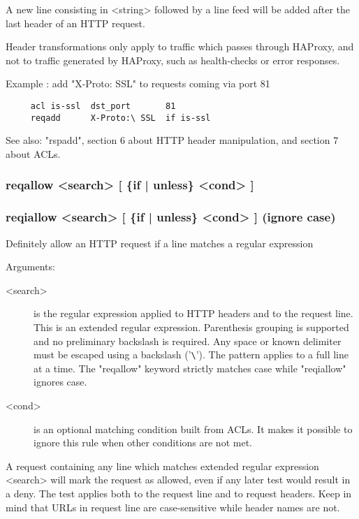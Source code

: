   A new line consisting in <string> followed by a line feed will be added after
  the last header of an HTTP request.

  Header transformations only apply to traffic which passes through HAProxy,
  and not to traffic generated by HAProxy, such as health-checks or error
  responses.

  Example : add "X-Proto: SSL" to requests coming via port 81
\begin{verbatim}
     acl is-ssl  dst_port       81
     reqadd      X-Proto:\ SSL  if is-ssl
\end{verbatim}

  See also: "rspadd", section 6 about HTTP header manipulation, and section 7
            about ACLs.

\subsubsection[reqallow]{reqallow  <search> [ \{if | unless\} <cond> ]}
\subsubsection[reqiallow]{reqiallow <search> [ \{if | unless\} <cond> ] (ignore case)}


  Definitely allow an HTTP request if a line matches a regular expression


  Arguments:

\begin{description}
\item[<search>] is the regular expression applied to HTTP headers and to the
              request line. This is an extended regular expression. Parenthesis
              grouping is supported and no preliminary backslash is required.
              Any space or known delimiter must be escaped using a backslash
              ('\verb|\|'). The pattern applies to a full line at a time. The
              "reqallow" keyword strictly matches case while "reqiallow"
              ignores case.

\item[<cond>] is an optional matching condition built from ACLs. It makes it
              possible to ignore this rule when other conditions are not met.
\end{description}

  A request containing any line which matches extended regular expression
  <search> will mark the request as allowed, even if any later test would
  result in a deny. The test applies both to the request line and to request
  headers. Keep in mind that URLs in request line are case-sensitive while
  header names are not.


